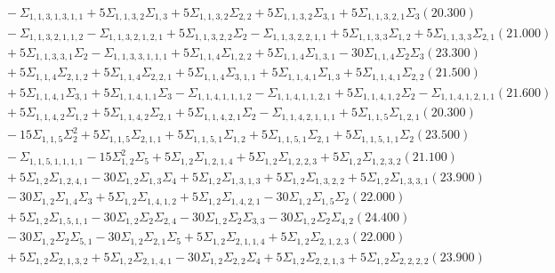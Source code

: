 \documentclass[12pt]{article}
\begin{document}
\begin{landscape}
\begin{align*}
		&\quad\quad -\Sigma_{1,1,3,1,3,1,1}+5\Sigma_{1,1,3,2}\Sigma_{1,3}+5\Sigma_{1,1,3,2}\Sigma_{2,2}+5\Sigma_{1,1,3,2}\Sigma_{3,1}+5\Sigma_{1,1,3,2,1}\Sigma_{3}(20.300) \\ 
		&\quad\quad -\Sigma_{1,1,3,2,1,1,2}-\Sigma_{1,1,3,2,1,2,1}+5\Sigma_{1,1,3,2,2}\Sigma_{2}-\Sigma_{1,1,3,2,2,1,1}+5\Sigma_{1,1,3,3}\Sigma_{1,2}+5\Sigma_{1,1,3,3}\Sigma_{2,1}(21.000) \\ 
		&\quad\quad +5\Sigma_{1,1,3,3,1}\Sigma_{2}-\Sigma_{1,1,3,3,1,1,1}+5\Sigma_{1,1,4}\Sigma_{1,2,2}+5\Sigma_{1,1,4}\Sigma_{1,3,1}-30\Sigma_{1,1,4}\Sigma_{2}\Sigma_{3}(23.300) \\ 
		&\quad\quad +5\Sigma_{1,1,4}\Sigma_{2,1,2}+5\Sigma_{1,1,4}\Sigma_{2,2,1}+5\Sigma_{1,1,4}\Sigma_{3,1,1}+5\Sigma_{1,1,4,1}\Sigma_{1,3}+5\Sigma_{1,1,4,1}\Sigma_{2,2}(21.500) \\ 
		&\quad\quad +5\Sigma_{1,1,4,1}\Sigma_{3,1}+5\Sigma_{1,1,4,1,1}\Sigma_{3}-\Sigma_{1,1,4,1,1,1,2}-\Sigma_{1,1,4,1,1,2,1}+5\Sigma_{1,1,4,1,2}\Sigma_{2}-\Sigma_{1,1,4,1,2,1,1}(21.600) \\ 
		&\quad\quad +5\Sigma_{1,1,4,2}\Sigma_{1,2}+5\Sigma_{1,1,4,2}\Sigma_{2,1}+5\Sigma_{1,1,4,2,1}\Sigma_{2}-\Sigma_{1,1,4,2,1,1,1}+5\Sigma_{1,1,5}\Sigma_{1,2,1}(20.300) \\ 
		&\quad\quad -15\Sigma_{1,1,5}\Sigma_{2}^{2}+5\Sigma_{1,1,5}\Sigma_{2,1,1}+5\Sigma_{1,1,5,1}\Sigma_{1,2}+5\Sigma_{1,1,5,1}\Sigma_{2,1}+5\Sigma_{1,1,5,1,1}\Sigma_{2}(23.500) \\ 
		&\quad\quad -\Sigma_{1,1,5,1,1,1,1}-15\Sigma_{1,2}^{2}\Sigma_{5}+5\Sigma_{1,2}\Sigma_{1,2,1,4}+5\Sigma_{1,2}\Sigma_{1,2,2,3}+5\Sigma_{1,2}\Sigma_{1,2,3,2}(21.100) \\ 
		&\quad\quad +5\Sigma_{1,2}\Sigma_{1,2,4,1}-30\Sigma_{1,2}\Sigma_{1,3}\Sigma_{4}+5\Sigma_{1,2}\Sigma_{1,3,1,3}+5\Sigma_{1,2}\Sigma_{1,3,2,2}+5\Sigma_{1,2}\Sigma_{1,3,3,1}(23.900) \\ 
		&\quad\quad -30\Sigma_{1,2}\Sigma_{1,4}\Sigma_{3}+5\Sigma_{1,2}\Sigma_{1,4,1,2}+5\Sigma_{1,2}\Sigma_{1,4,2,1}-30\Sigma_{1,2}\Sigma_{1,5}\Sigma_{2}(22.000) \\ 
		&\quad\quad +5\Sigma_{1,2}\Sigma_{1,5,1,1}-30\Sigma_{1,2}\Sigma_{2}\Sigma_{2,4}-30\Sigma_{1,2}\Sigma_{2}\Sigma_{3,3}-30\Sigma_{1,2}\Sigma_{2}\Sigma_{4,2}(24.400) \\ 
		&\quad\quad -30\Sigma_{1,2}\Sigma_{2}\Sigma_{5,1}-30\Sigma_{1,2}\Sigma_{2,1}\Sigma_{5}+5\Sigma_{1,2}\Sigma_{2,1,1,4}+5\Sigma_{1,2}\Sigma_{2,1,2,3}(22.000) \\ 
		&\quad\quad +5\Sigma_{1,2}\Sigma_{2,1,3,2}+5\Sigma_{1,2}\Sigma_{2,1,4,1}-30\Sigma_{1,2}\Sigma_{2,2}\Sigma_{4}+5\Sigma_{1,2}\Sigma_{2,2,1,3}+5\Sigma_{1,2}\Sigma_{2,2,2,2}(23.900) \\ 

\end{align*}
\end{landscape}
\end{document}
